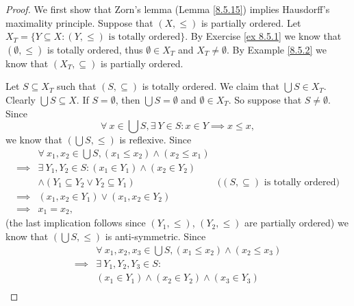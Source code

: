 \begin{proof}
    We first show that Zorn's lemma (Lemma \ref{8.5.15}) implies Hausdorff's maximality principle.
    Suppose that \((X, \leq)\) is partially ordered.
    Let \(X_T = \{Y \subseteq X : (Y, \leq) \text{ is totally ordered}\}\).
    By Exercise \ref{ex 8.5.1} we know that \((\emptyset, \leq)\) is totally ordered, thus \(\emptyset \in X_T\) and \(X_T \neq \emptyset\).
    By Example \ref{8.5.2} we know that \((X_T, \subseteq)\) is partially ordered.

    Let \(S \subseteq X_T\) such that \((S, \subseteq)\) is totally ordered.
    We claim that \(\bigcup S \in X_T\).
    Clearly \(\bigcup S \subseteq X\).
    If \(S = \emptyset\), then \(\bigcup S = \emptyset\) and \(\emptyset \in X_T\).
    So suppose that \(S \neq \emptyset\).
    Since
    \[
        \forall\ x \in \bigcup S, \exists\ Y \in S : x \in Y \implies x \leq x,
    \]
    we know that \((\bigcup S, \leq)\) is reflexive.
    Since
    \begin{align*}
                 & \forall\ x_1, x_2 \in \bigcup S, (x_1 \leq x_2) \land (x_2 \leq x_1)                                                  \\
        \implies & \exists\ Y_1, Y_2 \in S : (x_1 \in Y_1) \land (x_2 \in Y_2)                                                           \\
                 & \land (Y_1 \subseteq Y_2 \lor Y_2 \subseteq Y_1)                     & \text{(\((S, \subseteq)\) is totally ordered)} \\
        \implies & (x_1, x_2 \in Y_1) \lor (x_1, x_2 \in Y_2)                                                                            \\
        \implies & x_1 = x_2,
    \end{align*}
    (the last implication follows since \((Y_1, \leq)\), \((Y_2, \leq)\) are partially ordered)
    we know that \((\bigcup S, \leq)\) is anti-symmetric.
    Since
    \begin{align*}
                 & \forall\ x_1, x_2, x_3 \in \bigcup S, (x_1 \leq x_2) \land (x_2 \leq x_3)                                                          \\
        \implies & \exists\ Y_1, Y_2, Y_3 \in S :                                                                                                     \\
                 & (x_1 \in Y_1) \land (x_2 \in Y_2) \land (x_3 \in Y_3)                                                                              \\

\end{align*}
\end{proof}
